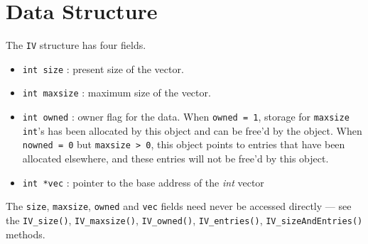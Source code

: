 \par
\section{Data Structure}
\label{section:IV:dataStructure}
\par
\par
The {\tt IV} structure has four fields.
\begin{itemize}
\item
{\tt int size} : present size of the vector.
\item
{\tt int maxsize} : maximum size of the vector.
\item
{\tt int owned} : owner flag for the data.
When {\tt owned = 1}, storage for {\tt maxsize} {\tt int}'s
has been allocated by this object and can be free'd by the object.
When {\tt nowned = 0} but {\tt maxsize > 0}, this object points to
entries that have been allocated elsewhere, and these entries will
not be free'd by this object.
\item
{\tt int *vec} : pointer to the base address of the {\it int} vector
\end{itemize}
The {\tt size}, {\tt maxsize}, {\tt owned} and {\tt vec} fields 
need never be accessed directly --- 
see the 
{\tt IV\_size()},
{\tt IV\_maxsize()},
{\tt IV\_owned()},
{\tt IV\_entries()},
{\tt IV\_sizeAndEntries()} methods.
